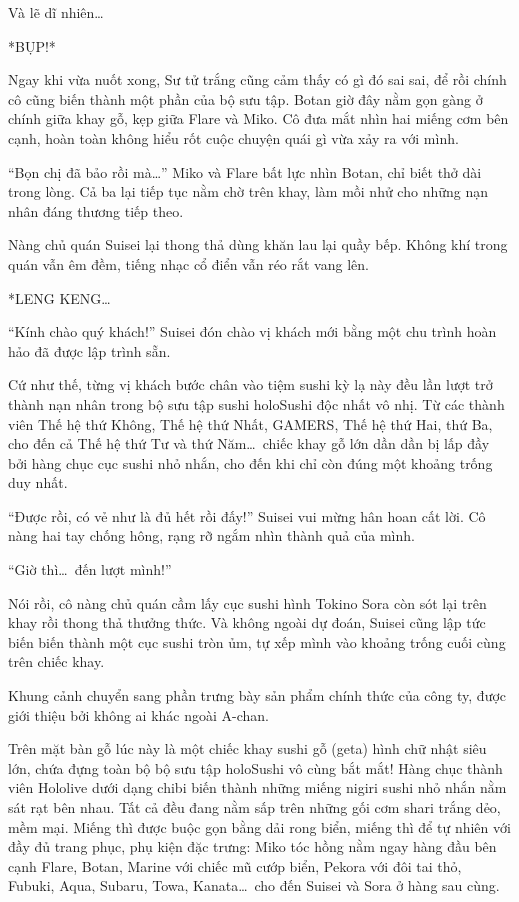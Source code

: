 \documentclass[../main.tex]{subfiles}
\begin{document}
Và lẽ dĩ nhiên\dots

*BỤP!*

Ngay khi vừa nuốt xong, Sư tử trắng cũng cảm thấy có gì đó sai sai, để rồi chính cô cũng biến thành một phần của bộ sưu tập. Botan giờ đây nằm gọn gàng ở chính giữa khay gỗ, kẹp giữa Flare và Miko. Cô đưa mắt nhìn hai miếng cơm bên cạnh, hoàn toàn không hiểu rốt cuộc chuyện quái gì vừa xảy ra với mình.


``Bọn chị đã bảo rồi mà\dots'' Miko và Flare bất lực nhìn Botan, chỉ biết thở dài trong lòng. Cả ba lại tiếp tục nằm chờ trên khay, làm mồi nhử cho những nạn nhân đáng thương tiếp theo.

\ct

Nàng chủ quán Suisei lại thong thả dùng khăn lau lại quầy bếp. Không khí trong quán vẫn êm đềm, tiếng nhạc cổ điển vẫn réo rắt vang lên.

*LENG KENG\dots*

``Kính chào quý khách!'' Suisei đón chào vị khách mới bằng một chu trình hoàn hảo đã được lập trình sẵn.

Cứ như thế, từng vị khách bước chân vào tiệm sushi kỳ lạ này đều lần lượt trở thành nạn nhân trong bộ sưu tập sushi holoSushi độc nhất vô nhị. Từ các thành viên Thế hệ thứ Không, Thế hệ thứ Nhất, GAMERS, Thế hệ thứ Hai, thứ Ba, cho đến cả Thế hệ thứ Tư và thứ Năm\dots\ chiếc khay gỗ lớn dần dần bị lấp đầy bởi hàng chục cục sushi nhỏ nhắn, cho đến khi chỉ còn đúng một khoảng trống duy nhất.

``Được rồi, có vẻ như là đủ hết rồi đấy!'' Suisei vui mừng hân hoan cất lời. Cô nàng hai tay chống hông, rạng rỡ ngắm nhìn thành quả của mình.

``Giờ thì\dots\ đến lượt mình!''

Nói rồi, cô nàng chủ quán cầm lấy cục sushi hình Tokino Sora còn sót lại trên khay rồi thong thả thưởng thức. Và không ngoài dự đoán, Suisei cũng lập tức biến biến thành một cục sushi tròn ủm, tự xếp mình vào khoảng trống cuối cùng trên chiếc khay.

\ct

Khung cảnh chuyển sang phần trưng bày sản phẩm chính thức của công ty, được giới thiệu bởi không ai khác ngoài A-chan.

Trên mặt bàn gỗ lúc này là một chiếc khay sushi gỗ (geta) hình chữ nhật siêu lớn, chứa đựng toàn bộ bộ sưu tập holoSushi vô cùng bắt mắt! Hàng chục thành viên Hololive dưới dạng chibi biến thành những miếng nigiri sushi nhỏ nhắn nằm sát rạt bên nhau. Tất cả đều đang nằm sấp trên những gối cơm shari trắng dẻo, mềm mại. Miếng thì được buộc gọn bằng dải rong biển, miếng thì để tự nhiên với đầy đủ trang phục, phụ kiện đặc trưng: Miko tóc hồng nằm ngay hàng đầu bên cạnh Flare, Botan, Marine với chiếc mũ cướp biển, Pekora với đôi tai thỏ, Fubuki, Aqua, Subaru, Towa, Kanata\dots\ cho đến Suisei và Sora ở hàng sau cùng.
\end{document}
